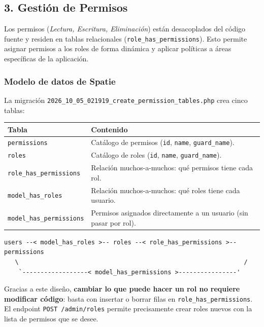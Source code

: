 \subsection{3. Gestión de Permisos}
Los permisos (\textit{Lectura, Escritura, Eliminación}) están desacoplados del código fuente y residen en tablas relacionales (\texttt{role\_has\_permissions}). Esto permite asignar permisos a los roles de forma dinámica y aplicar políticas a áreas específicas de la aplicación.

\subsubsection{Modelo de datos de Spatie}
La migración \texttt{2026\_10\_05\_021919\_create\_permission\_tables.php} crea cinco tablas:
\begin{longtable}{p{5cm}p{10cm}}
\toprule
\textbf{Tabla} & \textbf{Contenido} \\
\midrule
\endhead
\texttt{permissions} & Catálogo de permisos (\texttt{id}, \texttt{name}, \texttt{guard\_name}). \\
\texttt{roles} & Catálogo de roles (\texttt{id}, \texttt{name}, \texttt{guard\_name}). \\
\texttt{role\_has\_permissions} & Relación muchos-a-muchos: qué permisos tiene cada rol. \\
\texttt{model\_has\_roles} & Relación muchos-a-muchos: qué roles tiene cada usuario. \\
\texttt{model\_has\_permissions} & Permisos asignados directamente a un usuario (sin pasar por rol). \\
\bottomrule
\end{longtable}

\begin{lstlisting}[language={}, caption={Relaciones entre las tablas}]
 users --< model_has_roles >-- roles --< role_has_permissions >-- permissions
   \                                                              /
    `------------------< model_has_permissions >----------------'
\end{lstlisting}

Gracias a este diseño, \textbf{cambiar lo que puede hacer un rol no requiere modificar código}: basta con insertar o borrar filas en \texttt{role\_has\_permissions}. El endpoint \texttt{POST /admin/roles} permite precisamente crear roles nuevos con la lista de permisos que se desee.


